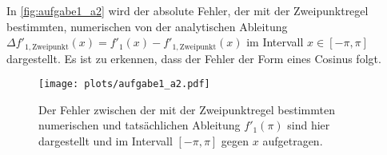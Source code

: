     In \autoref{fig:aufgabe1_a2} wird der absolute Fehler, der mit der Zweipunktregel bestimmten, numerischen von der analytischen Ableitung $\Delta f'_{\mathrm{1,Zweipunkt}}(x) = f'_1(x) - f'_{\mathrm{1,Zweipunkt}}(x)$ im Intervall $x \in [-\pi, \pi]$ dargestellt.
    Es ist zu erkennen, dass der Fehler der Form eines Cosinus folgt.

    \begin{figure}[ht]
      \center
      \texttt{[image: plots/aufgabe1\_a2.pdf]}
      \caption{Der Fehler zwischen der mit der Zweipunktregel bestimmten numerischen und tatsächlichen Ableitung $f'_1(\pi)$ sind hier dargestellt und im Intervall $[-\pi, \pi]$ gegen $x$ aufgetragen.}
      \label{fig:aufgabe1_a2}
    \end{figure}
